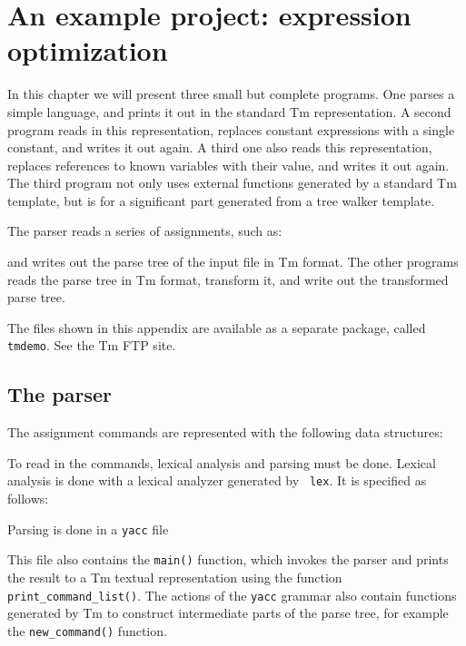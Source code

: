 \chapter{An example project: expression optimization}
\label{s.calc}
In this chapter we will present three small but complete programs.
One parses a simple language, and prints it out in the standard Tm
representation. A second program reads in this representation, replaces
constant expressions with a single constant, and writes it out again.
A third one also reads this representation, replaces references to
known variables with their value, and writes it out again.
The third program not only uses external functions generated by a
standard Tm template, but is for a significant part generated from
a tree walker template.

The parser reads a series of assignments, such as:
\begin{showfile}
\end{showfile}
and writes out the parse tree of the input file in Tm format.
The other programs reads the parse tree in Tm format, transform it,
and write out the transformed parse tree.

The files shown in this appendix are available as a separate package,
called \verb'tmdemo'. See the Tm FTP site.

\section{The parser}
\label{s.calcparser}
The assignment commands are represented with the following data structures:
\begin{showfile}
\end{showfile}

To read in the commands, lexical analysis and parsing must be done.
Lexical analysis is done with a lexical analyzer generated by {\tt
lex}. It is specified as follows:
\begin{showfile}
\end{showfile}

Parsing is done in a {\tt yacc} file
\begin{showfile}
\end{showfile}

This file also contains the \verb'main()' function, which invokes the
parser and prints the result to a Tm textual representation using the
function \verb'print_command_list()'. The actions of the {\tt yacc}
grammar also contain functions generated by Tm to construct intermediate 
parts of the parse tree, for example the \verb'new_command()' function.

